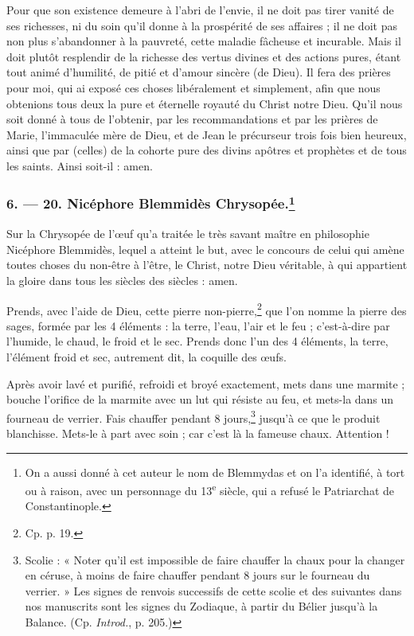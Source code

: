 \documentclass[a4paper, 11pt, oneside, polutonikogreek, french]{article}
\begin{document}
Pour que son existence demeure à l'abri de l'envie, il ne doit pas tirer vanité de ses richesses, ni du soin qu'il donne à la prospérité de ses affaires ; il ne doit pas non plus s'abandonner à la pauvreté, cette maladie fâcheuse et incurable. Mais il doit plutôt resplendir de la richesse des vertus divines et des actions pures, étant tout animé d'humilité, de pitié et d'amour sincère (de Dieu). Il fera des prières pour moi, qui ai exposé ces choses libéralement et simplement, afin que nous obtenions tous deux la pure et éternelle royauté du Christ notre Dieu. Qu'il nous soit donné à tous de l'obtenir, par les recommandations et par les prières de Marie, l'immaculée mère de Dieu, et de Jean le précurseur trois fois bien heureux, ainsi que par (celles) de la cohorte pure des divins apôtres et prophètes et de tous les saints. Ainsi soit-il : amen.

\bigskip
\centerline{\EightStarTaper}
\centerline{\EightStarTaper\EightStarTaper}
\bigskip

\subsubsection[6. --- 20. Nicéphore Blemmidès Chrysopée.]{6. --- 20. Nicéphore Blemmidès Chrysopée.\footnote{On a aussi donné à cet auteur le nom de Blemmydas et on l'a identifié, à tort ou à raison, avec un personnage du 13\textsuperscript{e} siècle, qui a refusé le Patriarchat de Constantinople.}}

Sur la Chrysopée de l'œuf qu'a traitée le très savant maître en philosophie Nicéphore Blemmidès, lequel a atteint le but, avec le concours de celui qui amène toutes choses du non-être à l'être, le Christ, notre Dieu véritable, à qui appartient la gloire dans tous les siècles des siècles : amen.

Prends, avec l'aide de Dieu, cette pierre non-pierre,\footnote{Cp. p. 19.} que l'on nomme la pierre des sages, formée par les 4 éléments : la terre, l'eau, l'air et le feu ; c'est-à-dire par l'humide, le chaud, le froid et le sec. Prends donc l'un des 4 éléments, la terre, l'élément froid et sec, autrement dit, la coquille des œufs.

Après avoir lavé et purifié, refroidi et broyé exactement, mets dans une marmite ; bouche l'orifice de la marmite avec un lut qui résiste au feu, et mets-la dans un fourneau de verrier. Fais chauffer pendant 8 jours,\footnote{Scolie : « Noter qu'il est impossible de faire chauffer la chaux pour la changer en céruse, à moins de faire chauffer pendant 8 jours sur le fourneau du verrier. » Les signes de renvois successifs de cette scolie et des suivantes dans nos manuscrits sont les signes du Zodiaque, à partir du Bélier jusqu'à la Balance. (Cp. \emph{Introd.}, p. 205.)} jusqu'à ce que le produit blanchisse. Mets-le à part avec soin ; car c'est là la fameuse chaux. Attention !
\end{document}
